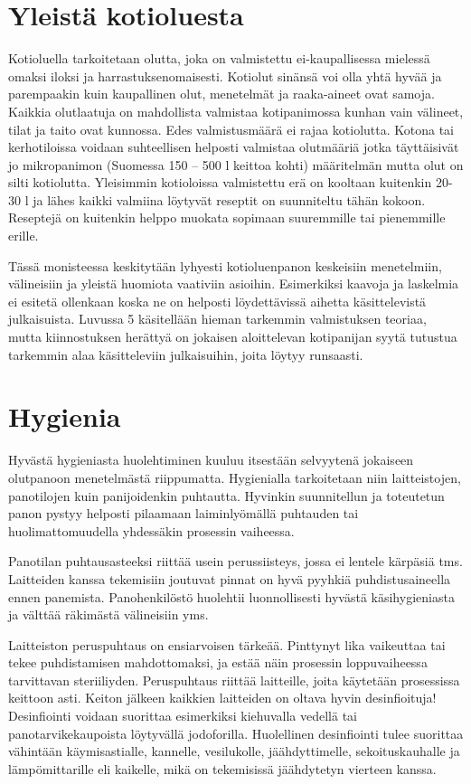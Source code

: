 \documentclass[a4paper,11pt]{report}
\begin{document}
\section{Yleistä kotioluesta}

Kotioluella tarkoitetaan olutta, joka on valmistettu ei-kaupallisessa mielessä omaksi iloksi ja harrastuksenomaisesti. Kotiolut sinänsä voi olla yhtä hyvää ja parempaakin kuin kaupallinen olut, menetelmät ja raaka-aineet ovat samoja. Kaikkia olutlaatuja on mahdollista valmistaa kotipanimossa kunhan vain välineet, tilat ja taito ovat kunnossa. Edes valmistusmäärä ei rajaa kotiolutta. Kotona tai kerhotiloissa voidaan suhteellisen helposti valmistaa olutmääriä jotka täyttäisivät jo mikropanimon (Suomessa 150 -- 500 l keittoa kohti) määritelmän mutta olut on silti kotiolutta. Yleisimmin kotioloissa valmistettu erä on kooltaan kuitenkin 20-30 l ja lähes kaikki valmiina löytyvät reseptit on suunniteltu tähän kokoon. Reseptejä on kuitenkin helppo muokata sopimaan suuremmille tai pienemmille erille.

Tässä monisteessa keskitytään lyhyesti kotioluenpanon keskeisiin menetelmiin, välineisiin ja yleistä huomiota vaativiin asioihin. Esimerkiksi kaavoja ja laskelmia ei esitetä ollenkaan koska ne on helposti löydettävissä aihetta käsittelevistä julkaisuista. Luvussa 5 käsitellään hieman tarkemmin valmistuksen teoriaa, mutta kiinnostuksen herättyä on jokaisen aloittelevan kotipanijan syytä tutustua tarkemmin alaa käsitteleviin julkaisuihin, joita löytyy runsaasti.

\section{Hygienia}

Hyvästä hygieniasta huolehtiminen kuuluu itsestään selvyytenä jokaiseen olutpanoon menetelmästä riippumatta. Hygienialla tarkoitetaan niin laitteistojen, panotilojen kuin panijoidenkin puhtautta. Hyvinkin suunnitellun ja toteutetun panon pystyy helposti pilaamaan laiminlyömällä puhtauden tai huolimattomuudella yhdessäkin prosessin vaiheessa.

Panotilan puhtausasteeksi riittää usein perussiisteys, jossa ei lentele kärpäsiä tms. Laitteiden kanssa tekemisiin joutuvat pinnat on hyvä pyyhkiä puhdistusaineella ennen panemista. Panohenkilöstö huolehtii luonnollisesti hyvästä käsihygieniasta ja välttää räkimästä välineisiin yms.

Laitteiston peruspuhtaus on ensiarvoisen tärkeää. Pinttynyt lika vaikeuttaa tai tekee puhdistamisen mahdottomaksi, ja estää näin prosessin loppuvaiheessa tarvittavan steriiliyden. Peruspuhtaus riittää laitteille, joita käytetään prosessissa keittoon asti. Keiton jälkeen kaikkien laitteiden on oltava hyvin desinfioituja! Desinfiointi voidaan suorittaa esimerkiksi kiehuvalla vedellä tai panotarvikekaupoista löytyvällä jodoforilla. Huolellinen desinfiointi tulee suorittaa vähintään käymisastialle, kannelle, vesilukolle, jäähdyttimelle, sekoituskauhalle ja lämpömittarille eli kaikelle, mikä on tekemisissä jäähdytetyn vierteen kanssa.
\end{document}
